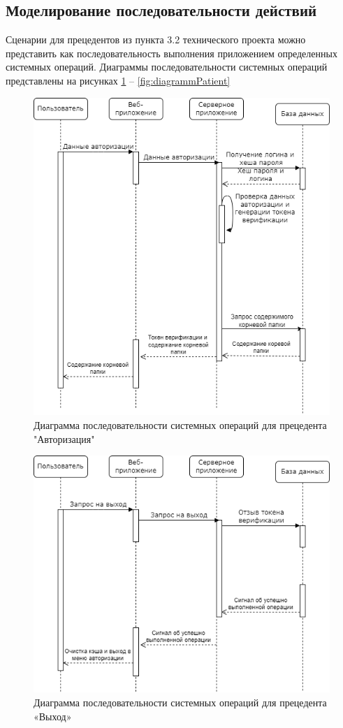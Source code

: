 \subsection{Моделирование последовательности действий}

Сценарии для прецедентов из пункта 3.2 технического проекта можно представить как последовательность выполнения приложением определенных системных операций. Диаграммы последовательности системных операций представлены на рисунках \ref{fig:precedentAvt} -- \ref{fig:diagrammPatient} 

\begin{figure}[H]
	\centering
	\includegraphics[width=0.7\linewidth]{"images/Диаграмма последовательности системных операций для прецедента «Авторизация».drawio"}
	\caption{Диаграмма последовательности системных операций для прецедента "Авторизация"}
	\label{fig:precedentAvt}
\end{figure}

\begin{figure}[H]
	\centering
	\includegraphics[width=0.7\linewidth]{"images/Диаграмма последовательности системных операций для прецедента «Выход».drawio"}
	\caption{Диаграмма последовательности системных операций для прецедента «Выход»}
	\label{fig:diagrammaExit}
\end{figure}

